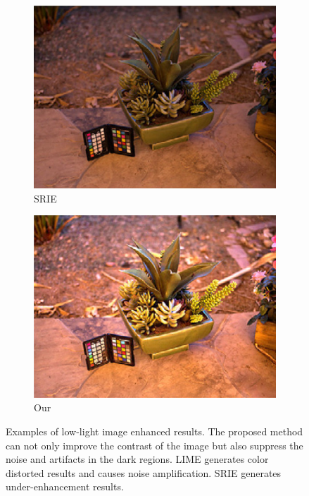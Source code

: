 \documentclass[letterpaper,10pt]{article}
\begin{document}
\begin{figure}[htbp]
\begin{subfigure}{0.24\textwidth}
					\includegraphics[width=\linewidth]{picture/LLIE/SRIE2}
					\captionsetup{font=scriptsize}
					\caption{SRIE}
					\label{fig: SRIE2}	
				\end{subfigure}
				\begin{subfigure}{0.24\textwidth}
					\includegraphics[width=\linewidth]{picture/LLIE/Our2}
					\captionsetup{font=scriptsize}
					\caption{Our}
					\label{fig: Our2}	
				\end{subfigure}
				\captionsetup{font=scriptsize}
				\caption{
					\label{fig: Examples of LLIE}
					Examples of low-light image enhanced results. The proposed method can not only improve the contrast of the image but also suppress the noise and artifacts in the dark regions. LIME generates color distorted results and causes noise amplification. SRIE generates under-enhancement results.
				}
			\end{figure}
			
\end{document}
